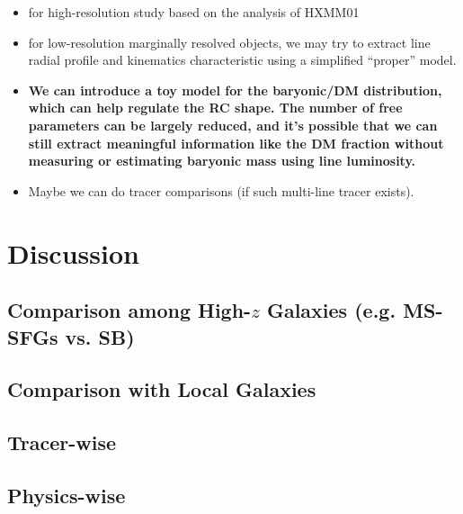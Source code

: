 \documentclass[twocolumn,tighten]{aastex62}
\begin{document}
\begin{itemize}
\item for high-resolution study based on the analysis of HXMM01
\item for low-resolution marginally resolved objects, we may try to extract line radial profile and kinematics characteristic using a simplified ``proper'' model.
\item {\bf We can introduce a toy model for the baryonic/DM distribution, which can help regulate the RC shape. The number of free parameters can be largely reduced, and it's possible that we can still extract meaningful information like the DM fraction without measuring or estimating baryonic mass using line luminosity.}
\item Maybe we can do tracer comparisons (if such multi-line tracer exists).
\end{itemize}

\section{Discussion}

\subsection{Comparison among High-$z$ Galaxies (e.g. MS-SFGs vs. SB)}

\citet{Drew:2018aa,Calistro-Rivera:2018aa,Forster-Schreiber:2018aa,ForsterSchreiber:2009hm,Genzel:2017fa,Lang:2017aa,Wisnioski:2015gk,Newman:2013ex,Decarli:2016ab}

\subsection{Comparison with Local Galaxies}

\citet{de-Blok:2008aa,Lelli:2016ab,Erroz-Ferrer:2016aa,Leung:2018aa,Bertemes:2018aa}


\subsection{Tracer-wise}

\citet{Valentino:2018aa,Levy:2018aa}


\subsection{Physics-wise}

\citet{Burkert:2010aa,Davies:2018aa}
\end{document}
